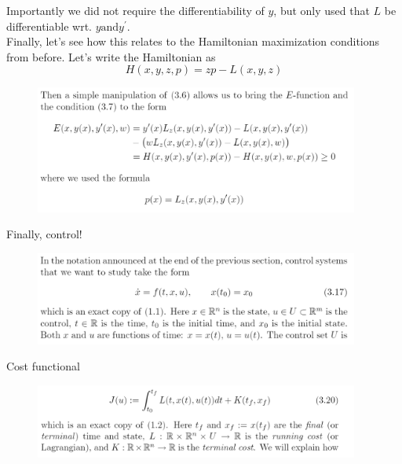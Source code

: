 \documentclass{beamer}
\begin{document}
    \begin{frame}
        Importantly we did not require the differentiability of $y$, but only used that $L$ be differentiable wrt. $y \textrm{and} y^{\prime}$.\\\medskip
        Finally, let's see how this relates to the Hamiltonian maximization conditions from before. Let's write the Hamiltonian as
        \begin{equation*}
            H ( x , y , z , p ) = z p - L ( x , y , z )
        \end{equation*}
        \begin{figure}[!htb]
	\centering
	\includegraphics[width=0.95\textwidth]{ch3/HamiltonianThing.png}
    \end{figure}
    \end{frame}
    \begin{frame}{Finally, control!}
        \begin{figure}[!htb]
	\centering
	\includegraphics[width=0.95\textwidth]{ch3/ControlDef.png}
    \end{figure}
    \end{frame}
    \begin{frame}{Cost functional}
        \begin{figure}[!htb]
	\centering
	\includegraphics[width=0.95\textwidth]{ch3/CostFunctional.png}
    \end{figure}
    \end{frame}
\end{document}
